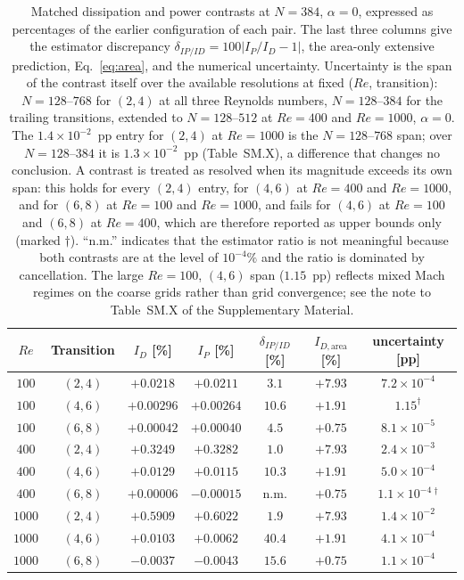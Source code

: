 \begin{table}[t]
\centering
\caption{Matched dissipation and power contrasts at $N=384$, $\alpha=0$, expressed as percentages of the earlier configuration of each pair. The last three columns give the estimator discrepancy $\delta_{IP/ID}=100|I_P/I_D-1|$, the area-only extensive prediction, Eq.~\eqref{eq:area}, and the numerical uncertainty. Uncertainty is the span of the contrast itself over the available resolutions at fixed ($Re$, transition): $N=128$--$768$ for $(2,4)$ at all three Reynolds numbers, $N=128$--$384$ for the trailing transitions, extended to $N=128$--$512$ at $Re=400$ and $Re=1000$, $\alpha=0$. The $1.4\times10^{-2}$~pp entry for $(2,4)$ at $Re=1000$ is the $N=128$--$768$ span; over $N=128$--$384$ it is $1.3\times10^{-2}$~pp (Table~SM.X), a difference that changes no conclusion. A contrast is treated as resolved when its magnitude exceeds its own span: this holds for every $(2,4)$ entry, for $(4,6)$ at $Re=400$ and $Re=1000$, and for $(6,8)$ at $Re=100$ and $Re=1000$, and fails for $(4,6)$ at $Re=100$ and $(6,8)$ at $Re=400$, which are therefore reported as upper bounds only (marked $\dagger$). ``n.m.'' indicates that the estimator ratio is not meaningful because both contrasts are at the level of $10^{-4}\%$ and the ratio is dominated by cancellation. The large $Re=100$, $(4,6)$ span ($1.15$~pp) reflects mixed Mach regimes on the coarse grids rather than grid convergence; see the note to Table~SM.X of the Supplementary Material.}
\label{tab:contrasts}
\begin{tabular}{@{}ccccccc@{}}
\hline
$Re$ & Transition & $I_D$ [\%] & $I_P$ [\%] & $\delta_{IP/ID}$ [\%] & $I_{D,\mathrm{area}}$ [\%] & uncertainty [pp] \\
\hline
$100$  & $(2,4)$ & $+0.0218$ & $+0.0211$ & $3.1$  & $+7.93$ & $7.2\times 10^{-4}$ \\
$100$  & $(4,6)$ & $+0.00296$ & $+0.00264$ & $10.6$ & $+1.91$ & $1.15^{\dagger}$ \\
$100$  & $(6,8)$ & $+0.00042$ & $+0.00040$ & $4.5$  & $+0.75$ & $8.1\times 10^{-5}$ \\
$400$  & $(2,4)$ & $+0.3249$ & $+0.3282$ & $1.0$  & $+7.93$ & $2.4\times 10^{-3}$ \\
$400$  & $(4,6)$ & $+0.0129$ & $+0.0115$ & $10.3$ & $+1.91$ & $5.0\times 10^{-4}$ \\
$400$  & $(6,8)$ & $+0.00006$& $-0.00015$& n.m.    & $+0.75$ & $1.1\times 10^{-4}$\,$^{\dagger}$ \\
$1000$ & $(2,4)$ & $+0.5909$ & $+0.6022$ & $1.9$  & $+7.93$ & $1.4\times 10^{-2}$ \\
$1000$ & $(4,6)$ & $+0.0103$ & $+0.0062$ & $40.4$ & $+1.91$ & $4.1\times 10^{-4}$ \\
$1000$ & $(6,8)$ & $-0.0037$ & $-0.0043$ & $15.6$ & $+0.75$ & $1.1\times 10^{-4}$ \\
\hline
\end{tabular}
\end{table}
